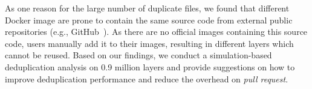 As one reason for the large number of duplicate files, we found that different Docker image are prone
to contain the same source code from external public repositories (e.g., GitHub~\cite{github}). As
there are no official images containing this source code, users manually add it to their images,
resulting in different layers which cannot be reused.
%
Based on our findings, 
%
we conduct a simulation-based deduplication analysis on 0.9 million layers 
and provide suggestions on how to improve deduplication
performance and reduce the overhead on \textit{pull request}.
%
%
%
%
%
%



